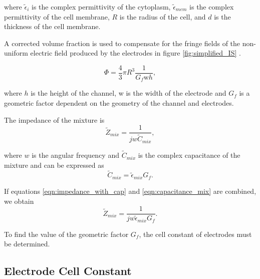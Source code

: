   \noindent where $\tilde{\epsilon}_i$ is the complex permittivity of the cytoplasm, $\tilde{\epsilon}_{mem}$ is the complex permittivity of the cell membrane, $R$ is the radius of the cell, and $d$ is the thickness of the cell membrane.
  
  \par A corrected volume fraction is used to compensate for the fringe fields of the non-uniform electric field produced by the electrodes in figure \ref{fig:simplified_IS} \cite{gawad_micromachined_2001}. 
  
  \begin{equation}
      \Phi = \frac{4}{3} \pi R^3 \frac{1}{G_f\text{w}h},
      \label{eqn:corrected_vf}
  \end{equation}
  
  \noindent where $h$ is the height of the channel, w is the width of the electrode and $G_f$ is a geometric factor dependent on the geometry of the channel and electrodes.
  
  \par The impedance of the mixture is
  \begin{equation}
    \tilde{Z}_{mix} = \frac{1}{jw\tilde{C}_{mix}},
    \label{eqn:impedance_with_cap}
  \end{equation}
  
  \noindent where $w$ is the angular frequency and $\tilde{C}_{mix}$ is the complex capacitance of the mixture and can be expressed as
  \begin{equation}
      \tilde{C}_{mix} = \tilde{\epsilon}_{mix} G_f.
      \label{eqn:capacitance_mix}
  \end{equation}
  
  \noindent If equations \ref{eqn:impedance_with_cap} and \ref{eqn:capacitance_mix} are combined, we obtain
  \begin{equation}
    \tilde{Z}_{mix} = \frac{1}{jw\tilde{\epsilon}_{mix}G_f}.
    \label{eqn:impedance_with_Gf}
  \end{equation}
  
  \par To find the value of the geometric factor $G_f$, the cell constant of electrodes must be determined.
  
  
  \subsection{Electrode Cell Constant}
  
